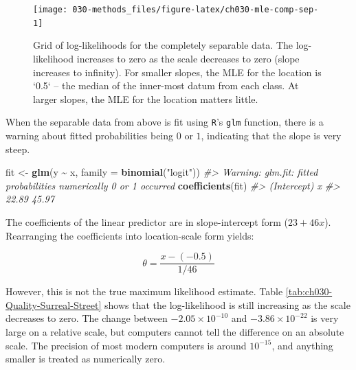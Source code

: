 \documentclass[11pt, oneside, openany]{scrbook}
\newenvironment{Shaded}{\begin{snugshade}}{\end{snugshade}}
\newcommand{\AttributeTok}[1]{\textcolor[rgb]{0.13,0.29,0.53}{#1}}
\newcommand{\CommentTok}[1]{\textcolor[rgb]{0.56,0.35,0.01}{\textit{#1}}}
\newcommand{\FunctionTok}[1]{\textcolor[rgb]{0.13,0.29,0.53}{\textbf{#1}}}
\newcommand{\NormalTok}[1]{#1}
\newcommand{\OtherTok}[1]{\textcolor[rgb]{0.56,0.35,0.01}{#1}}
\newcommand{\SpecialCharTok}[1]{\textcolor[rgb]{0.81,0.36,0.00}{\textbf{#1}}}
\newcommand{\StringTok}[1]{\textcolor[rgb]{0.31,0.60,0.02}{#1}}
\begin{document}
\begin{figure}

{\centering \texttt{[image: 030-methods\_files/figure-latex/ch030-mle-comp-sep-1]} 

}

\caption{Grid of log-likelihoods for the completely separable data. The log-likelihood increases to zero as the scale decreases to zero (slope increases to infinity). For smaller slopes, the MLE for the location is `0.5` -- the median of the inner-most datum from each class. At larger slopes, the MLE for the location matters little.}\label{fig:ch030-mle-comp-sep}
\end{figure}

When the separable data from above is fit using \texttt{R}'s \texttt{glm} function, there is a warning about fitted probabilities being \(0\) or \(1\), indicating that the slope is very steep.


\begin{Shaded}
\begin{Highlighting}[]
\NormalTok{fit }\OtherTok{\textless{}{-}} \FunctionTok{glm}\NormalTok{(y }\SpecialCharTok{\textasciitilde{}}\NormalTok{ x, }\AttributeTok{family =} \FunctionTok{binomial}\NormalTok{(}\StringTok{"logit"}\NormalTok{))}
\CommentTok{\#\textgreater{} Warning: glm.fit: fitted probabilities numerically 0 or 1 occurred}
\FunctionTok{coefficients}\NormalTok{(fit)}
\CommentTok{\#\textgreater{} (Intercept)           x }
\CommentTok{\#\textgreater{}       22.89       45.97}
\end{Highlighting}
\end{Shaded}


The coefficients of the linear predictor are in slope-intercept form (\(23 + 46 x\)). Rearranging the coefficients into location-scale form yields:

\begin{equation}
  \theta = \frac{x - (-0.5)}{1/46}
  \label{eq:rglmmle}
\end{equation}

However, this is not the true maximum likelihood estimate. Table \ref{tab:ch030-Quality-Surreal-Street} shows that the log-likelihood is still increasing as the scale decreases to zero. The change between \(-2.05\times 10^{-10}\) and \(-3.86\times10^{-22}\) is very large on a relative scale, but computers cannot tell the difference on an absolute scale. The precision of most modern computers is around \(10^{-15}\), and anything smaller is treated as numerically zero.
\end{document}

